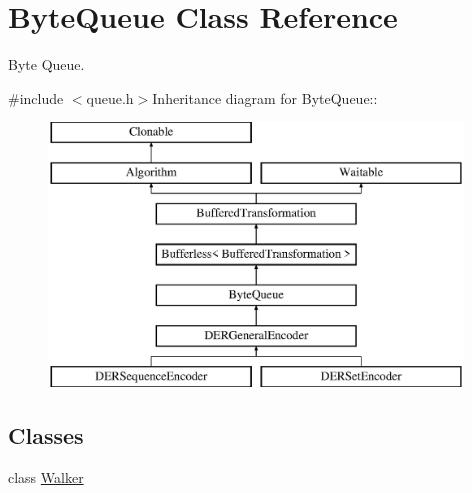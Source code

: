 \hypertarget{class_byte_queue}{
\section{ByteQueue Class Reference}
\label{class_byte_queue}
}


Byte Queue.  


{\ttfamily \#include $<$queue.h$>$}Inheritance diagram for ByteQueue::\begin{figure}[H]
\begin{center}
\leavevmode
\includegraphics[height=7cm]{class_byte_queue}
\end{center}
\end{figure}
\subsection*{Classes}
\begin{DoxyCompactItemize}
\item 
class \hyperlink{class_byte_queue_1_1_walker}{Walker}
\end{DoxyCompactItemize}
